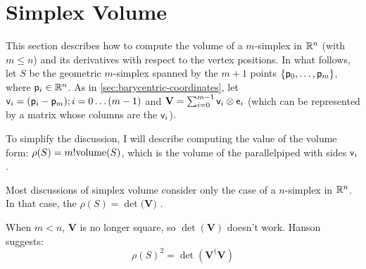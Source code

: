
\section{Simplex Volume}
\label{sec:simplex_volume}

\nocite{graphics-gems-4-1994}
\nocite{goodman-orourke-hdcg-2004}

This section describes how to compute
the volume of a $m$-simplex in $\mathbb{R}^n$ (with $m \le n$)
and its derivatives with respect to the vertex positions.
In what follows, let $S$ be the geometric $m$-simplex
spanned by the $m+1$ points $\{\mathsf{p}_0 , \ldots , \mathsf{p}_m\}$,
where $\mathsf{p}_i \in \mathbb{R}^n$.
As in \autoref{sec:barycentric-coordinates},
let $\mathsf{v}_i = (\mathsf{p}_i - \mathsf{p}_m); i = 0 \ldots (m-1)$
and ${\mathbf V} = \sum_{i=0}^{m-1} \mathsf{v}_i \otimes \mathsf{e}_i$
(which can be represented by a matrix whose columns are the $\mathsf{v}_i$).

To simplify the discussion, I will describe computing the
value of the volume form: $\rho(S) = m! \mathrm{volume}(S)$,
which is the volume of the parallelpiped with sides $\mathsf{v}_i$.

Most discussions of simplex volume consider
only the case of a $n$-simplex in $\mathbb{R}^n$.
In that case, the $\rho(S) = \det({\mathbf V)}$
\cite{henk-richter-gebet-ziegler-hdcg-16-2004}.

When $m < n$, ${\mathbf V}$ is no longer square,
so $\det({\mathbf V})$ doesn't work.
Hanson \cite{hanson-1994} suggests:
\begin{equation}
\rho(S)^2 = \det({\mathbf V}^{\dagger} {\mathbf V})
\end{equation}

